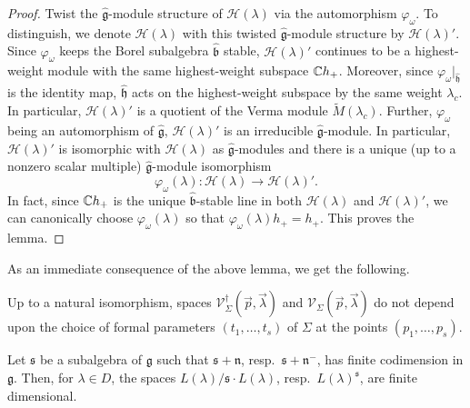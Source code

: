 \documentclass[12pt]{article}
\begin{document}
\begin{proof}
    Twist the $\widehat{\mathfrak g}$-module structure of $\mathcal H(\lambda)$ via the automorphism
    $\varphi_\omega$.
    To distinguish, we denote $\mathcal H(\lambda)$ with this twisted $\widehat{\mathfrak g}$-module structure by
    $\mathcal H(\lambda)'$.
    Since $\varphi_\omega$ keeps the Borel subalgebra $\widehat{\mathfrak b}$ stable,
    $\mathcal H(\lambda)'$ continues to be a highest-weight module with the same highest-weight subspace
    $\mathbb{C} h_+$.
    Moreover, since $\varphi_\omega|_{\widehat{\mathfrak h}}$ is the identity map,
    $\widehat{\mathfrak h}$ acts on the highest-weight subspace by the same weight $\lambda_c$.
    In particular, $\mathcal H(\lambda)'$ is a quotient of the Verma module $\widetilde M(\lambda_c)$.
    Further, $\varphi_\omega$ being an automorphism of $\widehat{\mathfrak g}$,
    $\mathcal H(\lambda)'$ is an irreducible $\widehat{\mathfrak g}$-module.
    In particular, $\mathcal H(\lambda)'$ is isomorphic with $\mathcal H(\lambda)$ as $\widehat{\mathfrak g}$-modules and there is a unique (up to a nonzero scalar multiple)
    $\widehat{\mathfrak g}$-module isomorphism
    \[
        \varphi_\omega(\lambda)\colon
        \mathcal H(\lambda) \longrightarrow \mathcal H(\lambda)'.
    \]
    In fact, since $\mathbb{C} h_+$ is the unique $\widehat{\mathfrak b}$-stable line in both
    $\mathcal H(\lambda)$ and $\mathcal H(\lambda)'$, we can canonically choose
    $\varphi_\omega(\lambda)$ so that $\varphi_\omega(\lambda)h_+ = h_+$.
    This proves the lemma.
\end{proof}

As an immediate consequence of the above lemma, we get the following.

\begin{corollary}[Cor.~2.1.3]
    Up to a natural isomorphism, spaces
    $\mathcal V^{\dagger}_{\Sigma}(\vec p, \vec\lambda)$ and
    $\mathcal V_{\Sigma}(\vec p, \vec\lambda)$
    do not depend upon the choice of formal parameters
    $(t_1,\dots,t_s)$ of $\Sigma$ at the points $(p_1,\dots,p_s)$.
\end{corollary}

\begin{lemma}[Lemma~10.2.2]
    Let $\mathfrak s$ be a subalgebra of $\mathfrak g$ such that
    $\mathfrak s+\mathfrak n$, resp.\ $\mathfrak s+\mathfrak n^{-}$,
    has finite codimension in $\mathfrak g$.
    Then, for $\lambda\in D$, the spaces
    $L(\lambda)/\mathfrak s\cdot L(\lambda)$, resp.\ $L(\lambda)^{\mathfrak s}$,
    are finite dimensional.
\end{lemma}
\end{document}
